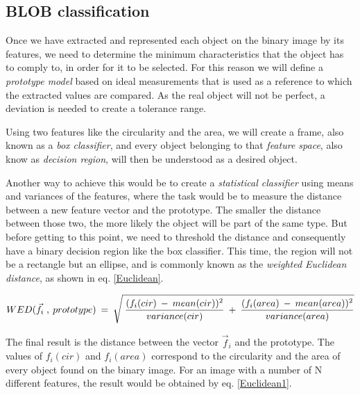 {%

\subsection{BLOB classification}
Once we have extracted and represented each object on the binary image by its features, we need to determine the minimum characteristics that the object has to comply to, in order for it to be selected. For this reason we will define a \textit{prototype model} based on ideal measurements that is used as a reference to which the extracted values are compared. As the real object will not be perfect, a deviation is needed to create a tolerance range.

Using two features like the circularity and the area, we will create a frame, also known as a \textit{box classifier}, and every object belonging to that \textit{feature space}, also know as \textit{decision region}, will then be understood as a desired object.

Another way to achieve this would be to create a \textit{statistical classifier} using means and variances of the features, where the task would be to measure the distance between a new feature vector and the prototype. The smaller the distance between those two, the more likely the object will be part of the same type. But before getting to this point, we need to threshold the distance and consequently have a binary decision region like the box classifier. This time, the region will not be a rectangle but an ellipse, and is commonly known as the \textit{weighted Euclidean distance}, as shown in eq. \ref{Euclidean}.

\begin{equation}	
	\begin{aligned}
{WED(\vec{f}_{i} \; , \: prototype)} \: = \: \sqrt{\mathstrut \:  \displaystyle\frac{(f_{i}(cir) \: - \: mean(cir))^2}{variance(cir)} \: + \: \displaystyle\frac{(f_{i}(area) \: - \: mean(area))^2}{variance(area)}}
\label{Euclidean}
	\end{aligned}
\end{equation}

The final result is the distance between the vector {$\vec{f}_{i}$} and the prototype. The values of {$f_{i}(cir)$} and {$f_{i}(area)$} correspond to the circularity and the area of every object found on the binary image. For an image with a number of N different features, the result would be obtained by eq. \ref{Euclidean1}.

}
